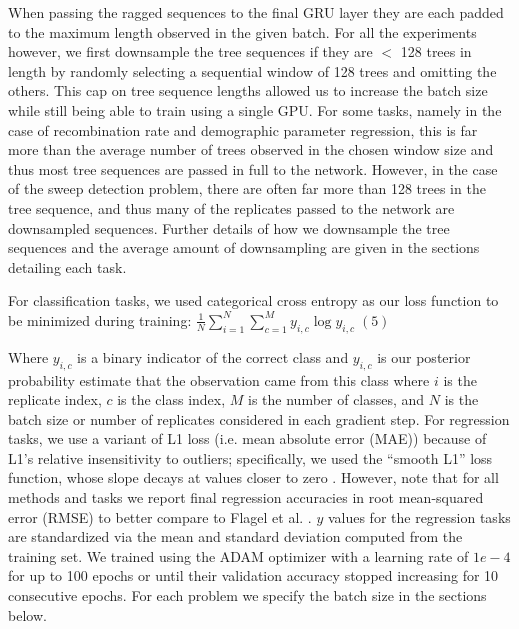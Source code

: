 When passing the ragged sequences to the final GRU layer they are each padded to the maximum length observed in the given batch. For all the experiments however, we first downsample the tree sequences if they are $<$ 128 trees in length by randomly selecting a sequential window of 128 trees and omitting the others. This cap on tree sequence lengths allowed us to increase the batch size while still being able to train using a single GPU. For some tasks, namely in the case of recombination rate and demographic parameter regression, this is far more than the average number of trees observed in the chosen window size and thus most tree sequences are passed in full to the network. However, in the case of the sweep detection problem, there are often far more than 128 trees in the tree sequence, and thus many of the replicates passed to the network are downsampled sequences. Further details of how we downsample the tree sequences and the average amount of downsampling are given in the sections detailing each task. 
 
For classification tasks, we used categorical cross entropy as our loss function to be minimized during training: $\frac{1}{N}\sum_{i=1}^{N}\sum_{c=1}^{M}{y_{i,c}}\log{y_{i,c}} \;(5)$

Where $y_{i,c}$ is a binary indicator of the correct class and $y_{i,c}$ is our posterior probability estimate that the observation came from this class where $i$ is the replicate index, $c$ is the class index, $M$ is the number of classes, and $N$ is the batch size or number of replicates considered in each gradient step. For regression tasks, we use a variant of L1 loss (i.e. mean absolute error (MAE)) because of L1's relative insensitivity to outliers; specifically, we used the “smooth L1” loss function, whose slope decays at values closer to zero \cite{girshickFastRCNN2015}. However, note that for all methods and tasks we report final regression accuracies in root mean-squared error (RMSE) to better compare to Flagel et al. \cite{flagelUnreasonableEffectivenessConvolutional2019}. $y$ values for the regression tasks are standardized via the mean and standard deviation computed from the training set. We trained using the ADAM optimizer \cite{kingmaAdamMethodStochastic2017} with a learning rate of $1e-4$ for up to 100 epochs or until their validation accuracy stopped increasing for 10 consecutive epochs. For each problem we specify the batch size in the sections below.


